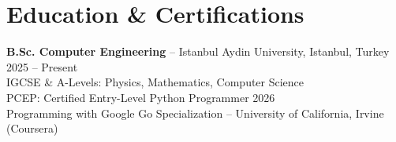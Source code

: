 \documentclass[10pt,a4paper]{article}
\begin{document}
\section*{Education \& Certifications}
\textbf{B.Sc. Computer Engineering} -- Istanbul Aydin University, Istanbul, Turkey \hfill 2025 -- Present\\
IGCSE \& A-Levels: Physics, Mathematics, Computer Science\\
PCEP: Certified Entry-Level Python Programmer \hfill 2026\\
Programming with Google Go Specialization -- University of California, Irvine (Coursera)

\end{document}
